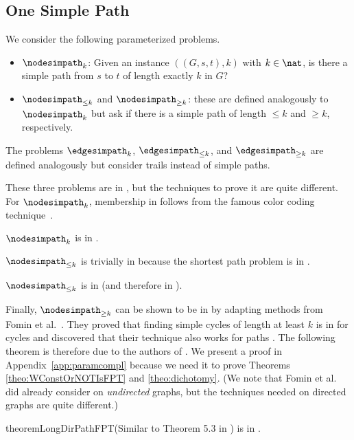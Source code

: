 \documentclass[a4paper,english]{lipics-v2016}
\theoremstyle{plain}
\begin{document}
\subsection{One Simple Path}\label{sec:onepath}



We consider the following parameterized problems.
\begin{itemize}
\item $\nodesimpath_k$: Given an instance $((G,s,t),k)$ with $k \in \nat$, is
  there a simple path from $s$ to $t$ of length exactly $k$ in $G$?
\item $\nodesimpath_{\leq k}$ and $\nodesimpath_{\geq k}$: 
      these are
  defined analogously to $\nodesimpath_k$ but ask if there is a simple
  path of length $\leq k$ and $\geq k$, respectively.
\end{itemize}
The problems $\edgesimpath_k$,  $\edgesimpath_{\leq k}$, and
$\edgesimpath_{\geq k}$ are defined analogously but consider trails
instead of simple paths.

These three problems are in \fpt, but the techniques to prove it are
quite different. For $\nodesimpath_k$, membership in \fpt follows from
the famous color
coding technique~\cite{AlonYZ-jacm95}.
\begin{theorem} \label{FPT:ak}
  $\nodesimpath_{k}$ is in \fpt.
\end{theorem}
$\nodesimpath_{\leq k}$ is trivially in \fpt because the shortest path
problem is in \ptime.
\begin{theorem} \label{FPT:leq-ak}
$\nodesimpath_{\leq k}$ is in \ptime (and therefore in \fpt).\end{theorem}

Finally, $\nodesimpath_{\geq k}$ can be shown to be in \fpt by adapting methods from Fomin et
al.~\cite{fomin}. They proved that finding simple cycles of length at
least $k$ is in \fpt for cycles and discovered that their technique also works for paths
\cite{holgercomm}. The following theorem is therefore due to the
authors of \cite{fomin}. We present a proof in Appendix~\ref{app:paramcompl}
because we need it to prove 
   Theorems \ref{theo:WConstOrNOTIsFPT} and \ref{theo:dichotomy}.
  (We note that Fomin et al.~\cite{fomin} did already consider
\longdirpath on \emph{undirected} graphs, but the techniques
needed on directed graphs are quite different.) 

\begin{restatable}{theorem}{LongDirPathFPT}(Similar to Theorem 5.3 in \cite{fomin}) \label{theorem:longdirpathInFPT}
\longdirpath is in \fpt.
\end{restatable}
\end{document}
